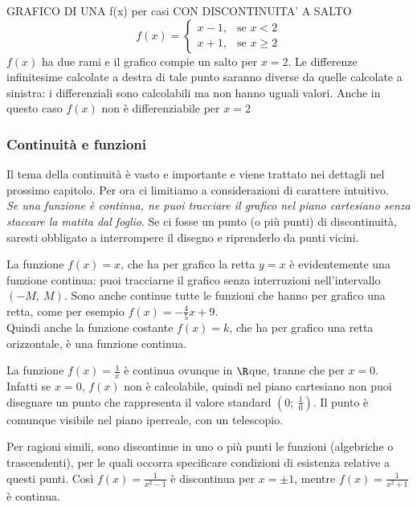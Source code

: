 GRAFICO DI UNA f(x) per casi CON DISCONTINUITA' A SALTO
\[
f(x)=\begin{cases} 
x-1, & \mbox{se }x<2 \\ 
x+1, & \mbox{se }x\ge 2
\end{cases}
\]
$f(x)$ ha due rami e il grafico compie un salto per $x=2$. Le differenze
infinitesime calcolate a destra di tale punto saranno diverse da quelle 
calcolate a sinistra: i differenziali sono calcolabili ma non hanno
uguali valori. Anche in questo caso $f(x)$ non è differenziabile per $x=2$

\subsubsection{Continuità e funzioni}
\label{subsubsec:diff01_diffcontinue}
Il tema della continuità è vasto e importante e viene trattato nei dettagli
nel prossimo capitolo. Per ora ci limitiamo a considerazioni di carattere intuitivo.\\
\emph{Se una funzione è continua, ne puoi tracciare il grafico nel piano cartesiano 
senza staccare la matita dal foglio}. Se ci fosse un punto (o più punti)
di discontinuità, saresti obbligato a interrompere il disegno e riprenderlo
da punti vicini.
\begin{esempio}
 La funzione $f(x)=x$, che ha per grafico la retta $y=x$ è evidentemente 
 una funzione continua: puoi tracciarne il grafico senza interruzioni
 nell'intervallo $(-M,\ M)$. Sono anche continue tutte le funzioni che hanno
 per grafico una retta, come per esempio $f(x)=-\frac{4}{5}x+9$.\\
 Quindi anche la funzione costante $f(x)=k$, che ha per grafico una retta
 orizzontale, è una funzione continua.
\end{esempio}
\begin{esempio}
 La funzione $f(x)=\frac{1}{x}$ è continua ovunque in $\R$que, tranne che per $x=0$.
 Infatti se $x=0$, $f(x)$ non è calcolabile, quindi nel piano cartesiano 
 non puoi disegnare un punto  che rappresenta il valore standard 
 $(0;\ \frac{1}{0})$. Il punto è comunque visibile nel piano iperreale, con un
 telescopio.
 \end{esempio}
\begin{esempio}
 Per ragioni simili, sono discontinue in uno o più punti le funzioni
 (algebriche o trascendenti), per le quali occorra specificare condizioni 
 di esistenza relative a questi punti.
 Così $f(x)=\frac{1}{x^2-1}$ è discontinua per $x=\pm 1$, mentre 
 $f(x)=\frac{1}{x^2+1}$ è continua.
\end{esempio}

